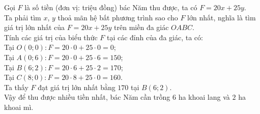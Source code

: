 \begin{bt}
{{\begin{tikzpicture}[scale=0.4, font=\footnotesize, line join=round, line cap=round, >=stealth]
\end{tikzpicture}}
		\noindent Gọi $F$ là số tiền (đơn vị: triệu đồng) bác Năm thu được, ta có $F=20x+25y$.\\
		Ta phải tìm $x$, $y$ thoả mãn hệ bất phương trình sao cho $F$ lớn nhất, nghĩa là tìm giá trị lớn nhất của $F=20x+25y$ trên miền đa giác $OABC$.\\
		Tính các giá trị của biểu thức $F$ tại các đỉnh của đa giác, ta có:\\
		Tại $O(0;0) \colon F=20 \cdot 0+25 \cdot 0=0$;\\
		Tại $A(0;6) \colon F=20 \cdot 0+25 \cdot 6=150$;\\
		Tại $B(6;2) \colon F=20 \cdot 6+25 \cdot 2=170$;\\
		Tại $C(8;0) \colon F=20 \cdot 8+25 \cdot 0=160$.\\
		Ta thấy $F$ đạt giá trị lớn nhất bằng $170$ tại $B(6;2)$.\\
		Vậy để thu được nhiều tiền nhất, bác Năm cần trồng $6$ ha khoai lang và $2$ ha khoai mì.
	}
\end{bt}

